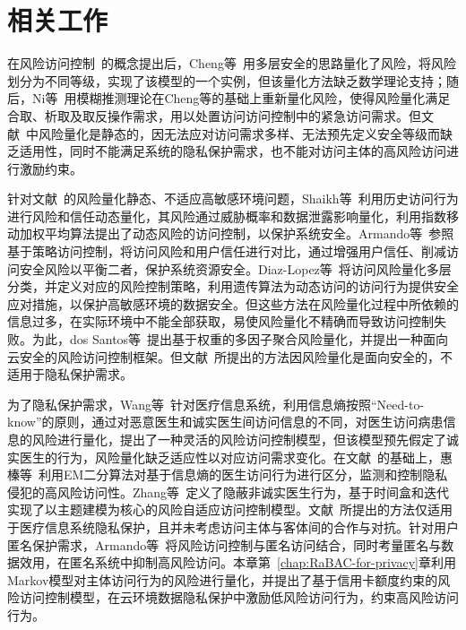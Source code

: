 \section{相关工作}

在风险访问控制~\cite{mcgraw2009risk}的概念提出后，Cheng等~\cite{cheng2007fuzzy}用多层安全的思路量化了风险，将风险划分为不同等级，实现了该模型的一个实例，但该量化方法缺乏数学理论支持；随后，Ni等~\cite{ni2010risk}用模糊推测理论在Cheng等的基础上重新量化风险，使得风险量化满足合取、析取及取反操作需求，用以处置访问访问控制中的紧急访问需求。但文献~\cite{cheng2007fuzzy,ni2010risk}中风险量化是静态的，因无法应对访问需求多样、无法预先定义安全等级而缺乏适用性，同时不能满足系统的隐私保护需求，也不能对访问主体的高风险访问进行激励约束。

针对文献~\cite{cheng2007fuzzy,ni2010risk}的风险量化静态、不适应高敏感环境问题，Shaikh等~\cite{shaikh2012dynamic}利用历史访问行为进行风险和信任动态量化，其风险通过威胁概率和数据泄露影响量化，利用指数移动加权平均算法提出了动态风险的访问控制，以保护系统安全。Armando等~\cite{armando2015balancing}参照基于策略访问控制，将访问风险和用户信任进行对比，通过增强用户信任、削减访问安全风险以平衡二者，保护系统资源安全。Diaz-Lopez等~\cite{diaz-lopez2016dynamic}将访问风险量化多层分类，并定义对应的风险控制策略，利用遗传算法为动态访问的访问行为提供安全应对措施，以保护高敏感环境的数据安全。但这些方法在风险量化过程中所依赖的信息过多，在实际环境中不能全部获取，易使风险量化不精确而导致访问控制失败。为此，dos Santos等~\cite{santos2016framework}提出基于权重的多因子聚合风险量化，并提出一种面向云安全的风险访问控制框架。但文献~\cite{shaikh2012dynamic,armando2015balancing,diaz-lopez2016dynamic,santos2016framework}所提出的方法因风险量化是面向安全的，不适用于隐私保护需求。

为了隐私保护需求，Wang等~\cite{wang2011quantified}针对医疗信息系统，利用信息熵按照“Need-to-know”的原则，通过对恶意医生和诚实医生间访问信息的不同，对医生访问病患信息的风险进行量化，提出了一种灵活的风险访问控制模型，但该模型预先假定了诚实医生的行为，风险量化缺乏适应性以对应访问需求变化。在文献~\cite{wang2011quantified}的基础上，惠榛等~\cite{hui2015risk}利用EM二分算法对基于信息熵的医生访问行为进行区分，监测和控制隐私侵犯的高风险访问性。Zhang等~\cite{zhang2018privacy}定义了隐蔽非诚实医生行为，基于时间盒和迭代实现了以主题建模为核心的风险自适应访问控制模型。文献~\cite{wang2011quantified,hui2015risk,zhang2018privacy}所提出的方法仅适用于医疗信息系统隐私保护，且并未考虑访问主体与客体间的合作与对抗。针对用户匿名保护需求，Armando等~\cite{armando2015risk}将风险访问控制与匿名访问结合，同时考量匿名与数据效用，在匿名系统中抑制高风险访问。本章第~\ref{chap:RaBAC-for-privacy}章利用Markov模型对主体访问行为的风险进行量化，并提出了基于信用卡额度约束的风险访问控制模型，在云环境数据隐私保护中激励低风险访问行为，约束高风险访问行为。

